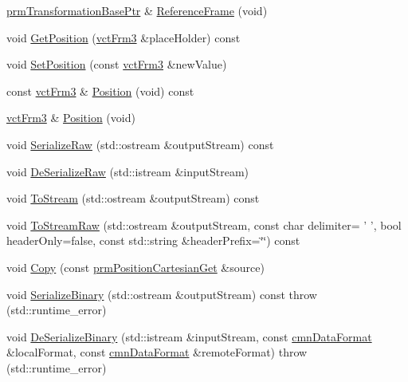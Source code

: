 \begin{DoxyCompactItemize}
\item 
\hyperlink{prm_transformation_base_8h_a881a6a7d2191474974cdf36d79e1df08}{prm\-Transformation\-Base\-Ptr} \& \hyperlink{classprm_position_cartesian_get_a1c5686f504916d1fb232e507da814e5d}{Reference\-Frame} (void)
\item 
void \hyperlink{classprm_position_cartesian_get_ad98a8838ac33b131ca955debad50900b}{Get\-Position} (\hyperlink{vct_transformation_types_8h_a81feda0a02c2d1bc26e5553f409fed20}{vct\-Frm3} \&place\-Holder) const 
\item 
void \hyperlink{classprm_position_cartesian_get_aef5db7a91ecc2becb507665a537bf64d}{Set\-Position} (const \hyperlink{vct_transformation_types_8h_a81feda0a02c2d1bc26e5553f409fed20}{vct\-Frm3} \&new\-Value)
\item 
const \hyperlink{vct_transformation_types_8h_a81feda0a02c2d1bc26e5553f409fed20}{vct\-Frm3} \& \hyperlink{classprm_position_cartesian_get_aa68a8c3bf694c2f1fef1ae3be6bde201}{Position} (void) const 
\item 
\hyperlink{vct_transformation_types_8h_a81feda0a02c2d1bc26e5553f409fed20}{vct\-Frm3} \& \hyperlink{classprm_position_cartesian_get_a2fb4d177c78b903fe1151449d6e939b8}{Position} (void)
\item 
void \hyperlink{classprm_position_cartesian_get_a519ae6a696101067e775381e76e32cdb}{Serialize\-Raw} (std\-::ostream \&output\-Stream) const 
\item 
void \hyperlink{classprm_position_cartesian_get_a6525c2d9f528757e00987ea0b9196084}{De\-Serialize\-Raw} (std\-::istream \&input\-Stream)
\item 
void \hyperlink{classprm_position_cartesian_get_a85b793084763652281e5d2225733620d}{To\-Stream} (std\-::ostream \&output\-Stream) const 
\item 
void \hyperlink{classprm_position_cartesian_get_a8ba57f6879b5d0ccde3e5d75f49a14d9}{To\-Stream\-Raw} (std\-::ostream \&output\-Stream, const char delimiter= ' ', bool header\-Only=false, const std\-::string \&header\-Prefix=\char`\"{}\char`\"{}) const 
\item 
void \hyperlink{classprm_position_cartesian_get_adccc20c9cbf5941265ebad7fe9611ea5}{Copy} (const \hyperlink{classprm_position_cartesian_get}{prm\-Position\-Cartesian\-Get} \&source)
\item 
void \hyperlink{classprm_position_cartesian_get_af52918f55b5820b982baa394ac141071}{Serialize\-Binary} (std\-::ostream \&output\-Stream) const   throw (std\-::runtime\-\_\-error)
\item 
void \hyperlink{classprm_position_cartesian_get_a3141c14f47e841dd509a481bbf259fea}{De\-Serialize\-Binary} (std\-::istream \&input\-Stream, const \hyperlink{classcmn_data_format}{cmn\-Data\-Format} \&local\-Format, const \hyperlink{classcmn_data_format}{cmn\-Data\-Format} \&remote\-Format)  throw (std\-::runtime\-\_\-error)

\end{DoxyCompactItemize}
